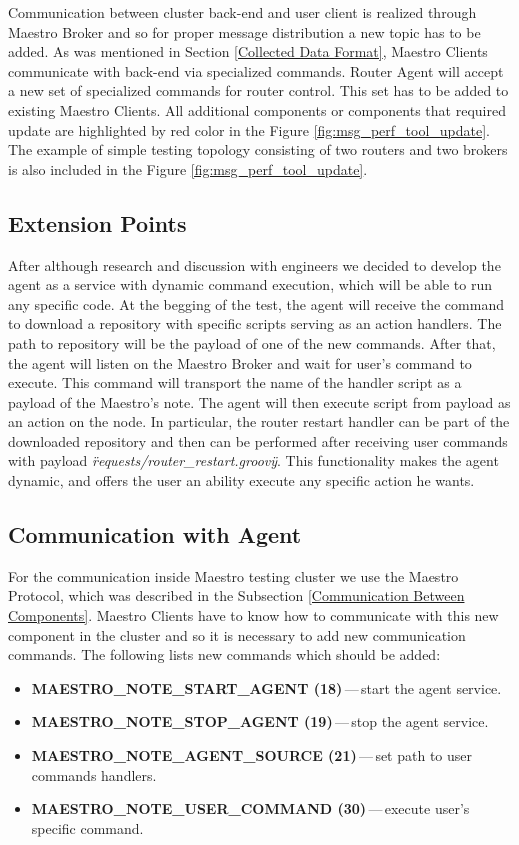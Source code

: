 Communication between cluster back-end and user client is realized through Maestro Broker and so for proper message distribution a new topic has to be added. As was mentioned in Section \ref{Collected Data Format}, Maestro Clients communicate with back-end via specialized commands. Router Agent will accept a new set of specialized commands for router control. This set has to be added to existing Maestro Clients. All additional components or components that required update are highlighted by red color in the Figure \ref{fig:msg_perf_tool_update}. The example of simple testing topology consisting of two routers and two brokers is also included in the Figure \ref{fig:msg_perf_tool_update}.


\subsection{Extension Points}
\label{Extension Points}
After although research and discussion with engineers we decided to develop the agent as a service with dynamic command execution, which will be able to run any specific code. At the begging of the test, the agent will receive the command to download a repository with specific scripts serving as an action handlers. The path to repository will be the payload of one of the new commands. After that, the agent will listen on the Maestro Broker and wait for user's command to execute. This command will transport the name of the handler script as a payload of the Maestro's note. The agent will then execute script from payload as an action on the node. In particular, the router restart handler can be part of the downloaded repository and then can be performed after receiving user commands with payload \emph{\"requests/router\_restart.groovy\"}. This functionality makes the agent dynamic, and offers the user an ability execute any specific action he wants.


\subsection{Communication with Agent}
\label{Communication with Agent}
For the communication inside Maestro testing cluster we use the Maestro Protocol, which was described in the Subsection \ref{Communication Between Components}. Maestro Clients have to know how to communicate with this new component in the cluster and so it is necessary to add new communication commands. The following lists new commands which should be added:

\begin{itemize}
	\setlength\itemsep{0em}
	\item \textbf{MAESTRO\_NOTE\_START\_AGENT (18)}\,---\,start the agent service.
	\item \textbf{MAESTRO\_NOTE\_STOP\_AGENT (19)}\,---\,stop the agent service.
	\item \textbf{MAESTRO\_NOTE\_AGENT\_SOURCE (21)}\,---\,set path to user commands handlers.
	\item \textbf{MAESTRO\_NOTE\_USER\_COMMAND (30)}\,---\,execute user's specific command.
\end{itemize}

